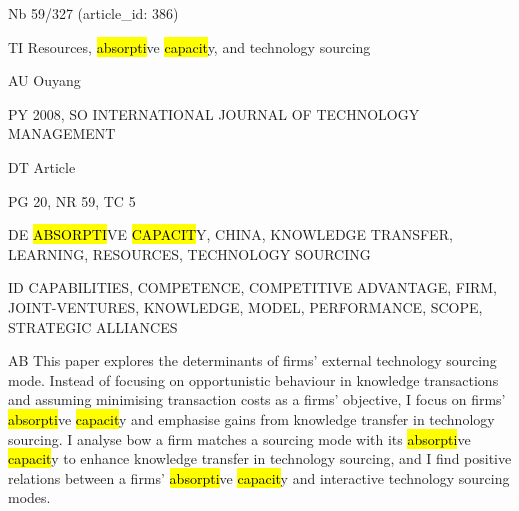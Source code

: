 \documentclass[a4paper]{article}
\begin{document}
\vspace*{-2cm}
Nb \tabto{0cm}59/327 (article\_id: 386)\par
TI \tabto{0cm}Resources, \hl{absorpti}ve \hl{capacit}y, and technology sourcing\par
AU \tabto{0cm}Ouyang\par
PY \tabto{0cm}2008, SO INTERNATIONAL JOURNAL OF TECHNOLOGY MANAGEMENT\par
DT \tabto{0cm}Article\par
PG \tabto{0cm}20, NR 59, TC 5\par
DE \tabto{0cm}\hl{ABSORPTI}VE \hl{CAPACIT}Y, CHINA, KNOWLEDGE TRANSFER, LEARNING, RESOURCES, TECHNOLOGY SOURCING\par
ID \tabto{0cm}CAPABILITIES, COMPETENCE, COMPETITIVE ADVANTAGE, FIRM, JOINT-VENTURES, KNOWLEDGE, MODEL, PERFORMANCE, SCOPE, STRATEGIC ALLIANCES\par
AB \tabto{0cm}This paper explores the determinants of firms' external technology sourcing mode. Instead of focusing on opportunistic behaviour in knowledge transactions and assuming minimising transaction costs as a firms' objective, I focus on firms' \hl{absorpti}ve \hl{capacit}y and emphasise gains from knowledge transfer in technology sourcing. I analyse bow a firm matches a sourcing mode with its \hl{absorpti}ve \hl{capacit}y to enhance knowledge transfer in technology sourcing, and I find positive relations between a firms' \hl{absorpti}ve \hl{capacit}y and interactive technology sourcing modes.\par
\clearpage
\end{document}
